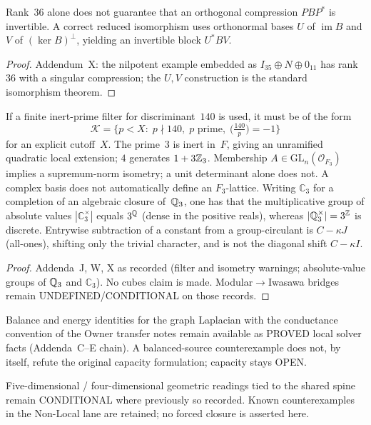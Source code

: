 \begin{proposition}\label{prop:v17-compression}
Rank~$36$ alone does not guarantee that an orthogonal compression $PBP^*$ is invertible. A correct reduced isomorphism uses orthonormal bases $U$ of $\operatorname{im} B$ and $V$ of $(\ker B)^\perp$, yielding an invertible block $U^*BV$.
\end{proposition}
\begin{proof}
Addendum~X: the nilpotent example embedded as $I_{35}\oplus N\oplus 0_{11}$ has rank~$36$ with a singular compression; the $U,V$ construction is the standard isomorphism theorem.
\end{proof}

\begin{proposition}\label{prop:v17-inert}
If a finite inert-prime filter for discriminant~$140$ is used, it must be of the form
\[
\mathcal K=\{p<X:\; p\nmid 140,\; p\text{ prime},\; \bigl(\tfrac{140}{p}\bigr)=-1\}
\]
for an explicit cutoff~$X$. The prime~$3$ is inert in~$F$, giving an unramified quadratic local extension; $4$ generates $1+3\mathbb{Z}_3$. Membership $A\in\mathrm{GL}_n(\mathcal O_{F_3})$ implies a supremum-norm isometry; a unit determinant alone does not. A complex basis does not automatically define an $F_3$-lattice. Writing $\mathbb C_3$ for a completion of an algebraic closure of~$\mathbb{Q}_3$, one has that the multiplicative group of absolute values $|\mathbb C_3^\times|$ equals $3^{\mathbb{Q}}$ (dense in the positive reals), whereas $|\mathbb{Q}_3^\times|=3^{\mathbb{Z}}$ is discrete. Entrywise subtraction of a constant from a group-circulant is $C-\kappa J$ (all-ones), shifting only the trivial character, and is not the diagonal shift $C-\kappa I$.
\end{proposition}
\begin{proof}
Addenda~J, W, X as recorded (filter and isometry warnings; absolute-value groups of $\mathbb{Q}_3$ and $\mathbb C_3$). No cubes claim is made. Modular$\to$Iwasawa bridges remain UNDEFINED/CONDITIONAL on those records.
\end{proof}

\begin{remark}\label{rem:v17-poisson}
Balance and energy identities for the graph Laplacian with the conductance convention of the Owner transfer notes remain available as PROVED local solver facts (Addenda~C--E chain). A balanced-source counterexample does not, by itself, refute the original capacity formulation; capacity stays OPEN.
\end{remark}

\begin{remark}[Geometry]\label{rem:v17-geometry}
Five-dimensional / four-dimensional geometric readings tied to the shared spine remain CONDITIONAL where previously so recorded. Known counterexamples in the Non-Local lane are retained; no forced closure is asserted here.
\end{remark}
